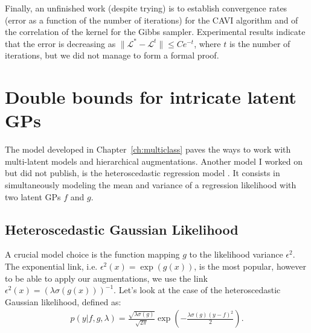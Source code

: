 Finally, an unfinished work (despite trying) is to establish convergence rates (error as a function of the number of iterations) for the \ac{CAVI} algorithm and of the correlation of the kernel for the Gibbs sampler.
Experimental results indicate that the error is decreasing as $\|\mathcal{L}^{*} - \mathcal{L}^{t}\|\leq C e^{-t}$, where $t$ is the number of iterations, but we did not manage to form a formal proof.


\section{Double bounds for intricate latent GPs}
\label{sec:heteroscedastic}
The model developed in Chapter~\ref{ch:multiclass} paves the ways to work with multi-latent models and hierarchical augmentations.
Another model I worked on but did not publish, is the heteroscedastic regression model \cite{wangGaussianProcessRegression2012,lazaro2011variational}.
It consists in simultaneously modeling the mean and variance of a regression likelihood with two latent \ac{GPs} $f$ and $g$.

\subsection{Heteroscedastic Gaussian Likelihood}

A crucial model choice is the function mapping $g$ to the likelihood variance $\epsilon^2$.
The exponential link, i.e. $\epsilon^2(x) = \exp(g(x))$, is the most popular, however to be able to apply our augmentations, we use the link $\epsilon^2(x) = \left(\lambda \sigma(g(x))\right)^{-1}$.
Let's look at the case of the heteroscedastic Gaussian likelihood, defined as:
\begin{align}
    p(y|f,g,\lambda) = \frac{\sqrt{\lambda \sigma(g)}}{\sqrt{2\pi}}\exp\left(-\frac{\lambda \sigma(g)(y-f)^2}{2}\right).\label{eq:hetero_lik}
\end{align}


